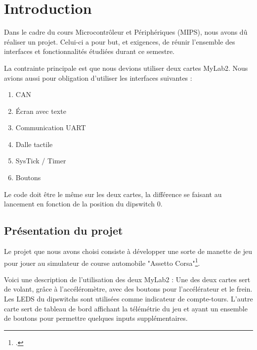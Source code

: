 \documentclass[french, 11pt]{article}
\newcommand{\blankpage}
{
	\null
	\thispagestyle{empty}
	\addtocounter{page}{-1}
	\newpage
}
\begin{document}
\begin{titlepage}
\begin{minipage}{0.53\textwidth}
		\end{minipage}
	
	\end{titlepage}
	
	\blankpage

	{\hypersetup{hidelinks} \tableofcontents}
	
	\pagebreak
	
	{\hypersetup{hidelinks} \listoffigures}
	
	
	{\hypersetup{hidelinks} \lstlistoflistings}
	
	\pagebreak

    \section{Introduction}

    Dans le cadre du cours Microcontrôleur et Périphériques (MIPS), nous avons dû réaliser un projet. Celui-ci a pour but, et exigences, de réunir l'ensemble des interfaces et fonctionnalités étudiées durant ce semestre.

    La contrainte principale est que nous devions utiliser deux cartes MyLab2. Nous avions aussi pour obligation d'utiliser les interfaces suivantes :

    \begin{enumerate}
        \item CAN
        \item Écran avec texte
        \item Communication UART
        \item Dalle tactile
        \item SysTick / Timer
        \item Boutons
    \end{enumerate}

	Le code doit être le même sur les deux cartes, la différence se faisant au lancement en fonction de la position du dipswitch 0.

    \subsection{Présentation du projet}

    Le projet que nous avons choisi consiste à développer une sorte de manette de jeu pour jouer au simulateur de course automobile "Assetto Corsa"\footcite{asseto}. 
	
	Voici une description de l'utilisation des deux MyLab2 : 
	Une des deux cartes sert de volant, grâce à l'accéléromètre, avec des boutons pour l'accélérateur et le frein. Les LEDS du dipswitchs sont utilisées comme indicateur de compte-tours. L'autre carte sert de tableau de bord affichant la télémétrie du jeu et ayant un ensemble de boutons pour permettre quelques inputs supplémentaires.
\end{document}
